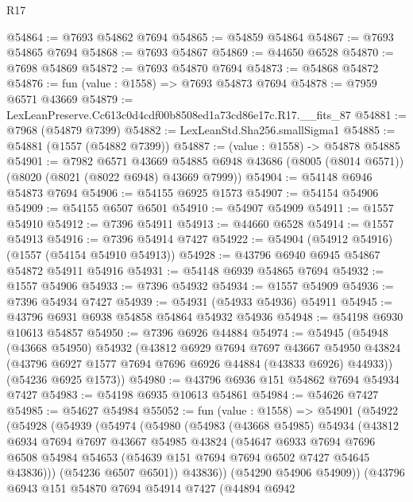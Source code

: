 \begin{lexlean}{R17}
\begin{coremodule}
@54864 := @7693 @54862 @7694
@54865 := @54859 @54864
@54867 := @7693 @54865 @7694
@54868 := @7693 @54867
@54869 := @44650 @6528
@54870 := @7698 @54869
@54872 := @7693 @54870 @7694
@54873 := @54868 @54872
@54876 := fun (value : @1558) => @7693 @54873 @7694
@54878 := @7959 @6571 @43669
@54879 := LexLeanPreserve.Cc613c0d4cdf00b8508ed1a73cd86e17c.R17.__fits_87
@54881 := @7968 (@54879 @7399)
@54882 := LexLeanStd.Sha256.smallSigma1
@54885 := @54881 (@1557 (@54882 @7399))
@54887 := (value : @1558) -> @54878 @54885
@54901 := @7982
    @6571
    @43669
    @54885
    @6948
    @43686
    (@8005 (@8014 @6571))
    (@8020 (@8021 (@8022 @6948) @43669 @7999))
@54904 := @54148 @6946 @54873 @7694
@54906 := @54155 @6925 @1573
@54907 := @54154 @54906
@54909 := @54155 @6507 @6501
@54910 := @54907 @54909
@54911 := @1557 @54910
@54912 := @7396 @54911
@54913 := @44660 @6528
@54914 := @1557 @54913
@54916 := @7396 @54914 @7427
@54922 := @54904 (@54912 @54916) (@1557 (@54154 @54910 @54913))
@54928 := @43796 @6940 @6945 @54867 @54872 @54911 @54916
@54931 := @54148 @6939 @54865 @7694
@54932 := @1557 @54906
@54933 := @7396 @54932
@54934 := @1557 @54909
@54936 := @7396 @54934 @7427
@54939 := @54931 (@54933 @54936) @54911
@54945 := @43796 @6931 @6938 @54858 @54864 @54932 @54936
@54948 := @54198 @6930 @10613 @54857
@54950 := @7396 @6926 @44884
@54974 := @54945
    (@54948
      (@43668 @54950)
      @54932
      (@43812
        @6929
        @7694
        @7697
        @43667
        @54950
        @43824
        (@43796 @6927 @1577 @7694 @7696 @6926 @44884 (@43833 @6926) @44933))
      (@54236 @6925 @1573))
@54980 := @43796 @6936 @151 @54862 @7694 @54934 @7427
@54983 := @54198 @6935 @10613 @54861
@54984 := @54626 @7427
@54985 := @54627 @54984
@55052 := fun (value : @1558) =>
  @54901
    (@54922
      (@54928
        (@54939
          (@54974
            (@54980
              (@54983
                (@43668 @54985)
                @54934
                (@43812
                  @6934
                  @7694
                  @7697
                  @43667
                  @54985
                  @43824
                  (@54647
                    @6933
                    @7694
                    @7696
                    @6508
                    @54984
                    @54653
                    (@54639 @151 @7694 @7694 @6502 @7427 @54645 @43836)))
                (@54236 @6507 @6501))
              @43836))
          (@54290 @54906 @54909))
        (@43796
          @6943
          @151
          @54870
          @7694
          @54914
          @7427
          (@44894
            @6942

\end{coremodule}
\end{lexlean}
